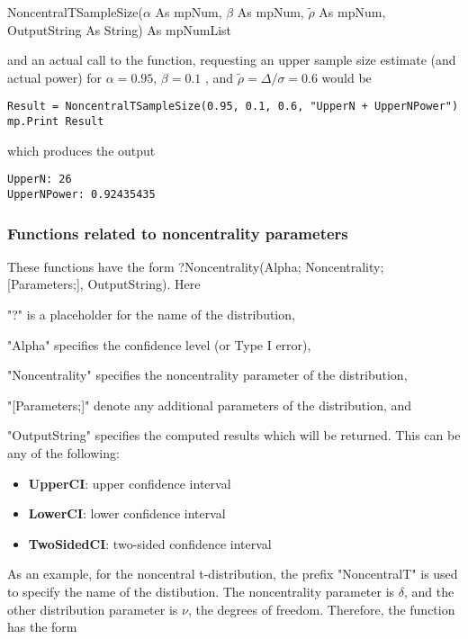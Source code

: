 \vspace{0.3cm}
\textsf{NoncentralTSampleSize($\alpha$ As mpNum, $\beta$ As mpNum, $\tilde{\rho}$ As mpNum, OutputString As String) As mpNumList}

\vspace{0.3cm}
and an actual call to the function, requesting an upper sample size estimate (and actual power) for $\alpha = 0.95$, $\beta=0.1$ , and $\tilde{\rho} = \Delta/\sigma = 0.6$   would be

\begin{lstlisting}
Result = NoncentralTSampleSize(0.95, 0.1, 0.6, "UpperN + UpperNPower")
mp.Print Result
\end{lstlisting}
which produces the output

\begin{verbatim}
UpperN: 26
UpperNPower: 0.92435435
\end{verbatim}



\newpage
\subsubsection{Functions related to noncentrality parameters}
\label{Functions related to noncentrality parameters}
These functions have the form \textsf{?Noncentrality(Alpha; Noncentrality; [Parameters;],  OutputString)}.
Here 

"?" is a placeholder for the name of the distribution, 

"Alpha" specifies the confidence level (or Type I error), 

"Noncentrality" specifies the noncentrality parameter of the distribution, 

"[Parameters;]" denote any additional parameters of the distribution, and 

"OutputString" specifies the computed results which will be returned. This can be any of the following:

\begin{itemize}
	\item \textbf{UpperCI}: upper confidence interval
	\item \textbf{LowerCI}: lower confidence interval
	\item \textbf{TwoSidedCI}: two-sided confidence interval
\end{itemize}


\vspace{0.3cm}
As an example, for the noncentral  t-distribution, the prefix "NoncentralT" is used to specify the name of the distibution. The noncentrality parameter is $\delta$, and the other distribution parameter is $\nu$, the degrees of freedom.  Therefore, the function has the form

